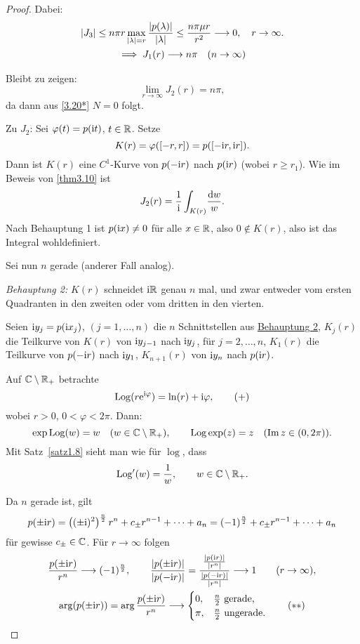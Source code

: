 \documentclass[a4paper,twoside,DIV15,BCOR12mm]{scrbook}
\begin{document}
\begin{proof}
Dabei:
\begin{gather*}
\left\lvert J_3\right\lvert\leq n\pi r\max_{\left\lvert\lambda\right\lvert=r}\frac{\left\lvert p(\lambda)\right\lvert}{\left\lvert\lambda\right\lvert}\leq\frac{n\pi\mu r}{r^2}\longrightarrow 0,\quad r\to\infty.\\
\implies J_1(r)\longrightarrow n\pi\quad(n\to\infty)
\end{gather*}

Bleibt zu zeigen:
\[\lim_{r\to\infty} J_2(r) = n\pi,\]
da dann aus \eqref{3.20*} $N=0$ folgt.

Zu $J_2$: Sei $\varphi(t) = p(\mathrm{i} t)$, $t\in\mathbb{R}$. Setze
\[K(r) = \varphi([-r,r]) = p([-\mathrm{i} r,\mathrm{i} r]).\]
Dann ist $K(r)$ eine $C^1$-Kurve von $p(-\mathrm{i} r)$ nach $p(\mathrm{i} r)$ (wobei $r\geq r_1$). Wie im Beweis von \ref{thm3.10} ist
\[J_2(r) = \frac{1}{\mathrm{i}}\int_{K(r)}\!\frac{\mathrm{d} w}{w}.\]
Nach Behauptung 1 ist $p(\mathrm{i} x)\neq 0$ für alle $x\in\mathbb{R}$, also $0\notin K(r)$, also ist das Integral wohldefiniert.

Sei nun $n$ gerade (anderer Fall analog).

\textit{Behauptung 2:}\label{3.20beh2} $K(r)$ schneidet $\mathrm{i}\mathbb{R}$ genau $n$ mal, und zwar entweder vom ersten Quadranten in den zweiten oder vom dritten in den vierten.

Seien $\mathrm{i} y_j = p(\mathrm{i} x_j)$, $(j=1,\dotsc,n)$ die $n$ Schnittstellen aus \hyperref[3.20beh2]{Behauptung 2}, $K_j(r)$ die Teilkurve von $K(r)$ von $\mathrm{i} y_{j-1}$ nach $\mathrm{i} y_j$, für $j=2,\dotsc,n$, $K_1(r)$ die Teilkurve von $p(-\mathrm{i} r)$ nach $\mathrm{i} y_1$, $K_{n+1}(r)$ von $\mathrm{i} y_n$ nach $p(\mathrm{i} r)$.

Auf $\mathbb{C}\setminus\mathbb{R}_+$ betrachte
\[\label{3.20+}\mathrm{Log}(r\mathrm{e}^{\mathrm{i}\varphi}) = \ln(r) + \mathrm{i}\varphi,\tag{+}\]
wobei $r>0$, $0<\varphi<2\pi$. Dann:
\[\exp\mathrm{Log}(w) = w\quad(w\in\mathbb{C}\setminus\mathbb{R}_+),\qquad\mathrm{Log}\exp(z) = z\quad(\operatorname{Im}{z}\in(0,2\pi)).\]
Mit Satz~\ref{satz1.8} sieht man wie für $\log$, dass
\[\mathrm{Log}^\prime(w) = \frac{1}{w},\qquad w\in\mathbb{C}\setminus\mathbb{R}_+.\]

Da $n$ gerade ist, gilt
\[p(\pm\mathrm{i} r) = \left((\pm\mathrm{i})^2\right)^{\frac{n}{2}}r^n + c_{\pm}r^{n-1}+\dotsb+a_n = (-1)^{\frac{n}{2}}+c_\pm r^{n-1} + \dotsb + a_n\]
für gewisse $c_\pm\in\mathbb{C}$. Für $r\to\infty$ folgen
\begin{gather*}
\frac{p(\pm\mathrm{i} r)}{r^n}\longrightarrow(-1)^{\frac{n}{2}},\qquad\frac{\left\lvert p(\pm\mathrm{i} r)\right\lvert}{\left\lvert p(-\mathrm{i} r)\right\lvert} = \frac{\frac{\left\lvert p(\mathrm{i} r)\right\lvert}{\left\lvert r^n\right\lvert}}{\frac{\left\lvert p(-\mathrm{i} r)\right\lvert}{\left\lvert r^n\right\lvert}}\longrightarrow 1\qquad(r\to\infty),\\
\label{3.20**}\arg(p(\pm\mathrm{i} r)) = \arg\frac{p(\pm\mathrm{i} r)}{r^n}\longrightarrow\begin{cases}0,&\frac{n}{2}\text{ gerade,}\\\pi,&\frac{n}{2}\text{ ungerade.}\end{cases}\tag{$**$}
\end{gather*}


\end{proof}
\end{document}
